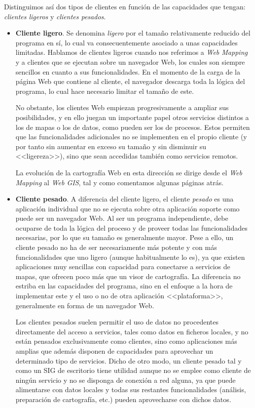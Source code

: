 Distinguimos así dos tipos de clientes en función de las capacidades que tengan: \emph{clientes ligeros} y \emph{clientes pesados}.

\begin{itemize}
	\item \textbf{Cliente ligero}. Se denomina \emph{ligero} por el tamaño relativamente reducido del programa en sí, lo cual va consecuentemente asociado a unas capacidades limitadas. Hablamos de clientes ligeros cuando nos referimos a \emph{Web Mapping} y a clientes que se ejecutan sobre un navegador Web, los cuales son siempre sencillos en cuanto a sus funcionalidades. En el momento de la carga de la página Web que contiene al cliente, el navegador descarga toda la lógica del programa, lo cual hace necesario limitar el tamaño de este.
	
	No obstante, los clientes Web empiezan progresivamente a ampliar sus posibilidades, y en ello juegan un importante papel otros servicios distintos a los de mapas o los de datos, como pueden ser los de procesos. Estos permiten que las funcionalidades adicionales no se implementen en el propio cliente (y por tanto sin aumentar en exceso su tamaño y sin disminuir su <<ligereza>>), sino que sean accedidas también como servicios remotos.
	
	La evolución de la cartografía Web en esta dirección se dirige desde el \emph{Web Mapping} al \emph{Web GIS}, tal y como comentamos algunas páginas atrás.
	
	\item \textbf{Cliente pesado}. A diferencia del cliente ligero, el cliente \emph{pesado} es una aplicación individual que no se ejecuta sobre otra aplicación soporte como puede ser un navegador Web. Al ser un programa independiente, debe ocuparse de toda la lógica del proceso y de proveer todas las funcionalidades necesarias, por lo que su tamaño es generalmente mayor. Pese a ello, un cliente pesado no ha de ser necesariamente más potente y con más funcionalidades que uno ligero (aunque habitualmente lo es), ya que existen aplicaciones muy sencillas con capacidad para conectarse a servicios de mapas, que ofrecen poco más que un visor de cartografía. La diferencia no estriba en las capacidades del programa, sino en el enfoque a la hora de implementar este y el uso o no de otra aplicación <<plataforma>>, generalmente en forma de un navegador Web.
	
	Los clientes pesados suelen permitir el uso de datos no procedentes directamente del acceso a servicios, tales como datos en ficheros locales, y no están pensados exclusivamente como clientes, sino como aplicaciones más amplias que además disponen de capacidades para aprovechar un determinado tipo de servicios. Dicho de otro modo, un cliente pesado tal y como un SIG de escritorio tiene utilidad aunque no se emplee como cliente de ningún servicio y no se disponga de conexión a red alguna, ya que puede alimentarse con datos locales y todas sus restantes funcionalidades (análisis, preparación de cartografía, etc.) pueden aprovecharse con dichos datos.
\end{itemize}

